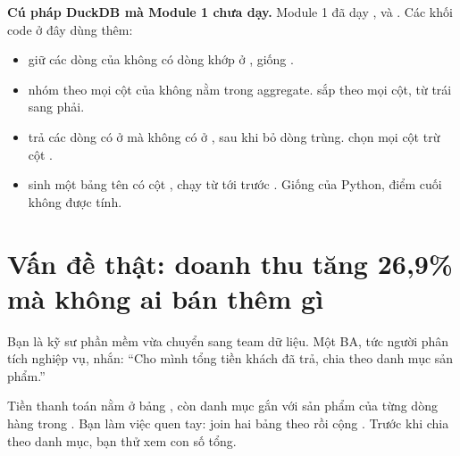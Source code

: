 \begin{ghichu}
\textbf{Cú pháp DuckDB mà Module 1 chưa dạy.} Module 1 đã dạy ,  và . Các khối code ở đây dùng thêm:
\begin{itemize}
  \item {} giữ các dòng của  không có dòng khớp ở , giống .
  \item {} nhóm theo mọi cột của  không nằm trong aggregate.  sắp theo mọi cột, từ trái sang phải.
  \item {} trả các dòng có ở  mà không có ở , sau khi bỏ dòng trùng.  chọn mọi cột trừ cột .
  \item {} sinh một bảng tên  có cột , chạy từ  tới trước . Giống  của Python, điểm cuối không được tính.
\end{itemize}
\end{ghichu}

\section{Vấn đề thật: doanh thu tăng 26,9\% mà không ai bán thêm gì}

Bạn là kỹ sư phần mềm vừa chuyển sang team dữ liệu. Một BA, tức người phân tích nghiệp vụ, nhắn: ``Cho mình tổng tiền khách đã trả, chia theo danh mục sản phẩm.''

Tiền thanh toán nằm ở bảng , còn danh mục gắn với sản phẩm của từng dòng hàng trong . Bạn làm việc quen tay: join hai bảng theo  rồi cộng . Trước khi chia theo danh mục, bạn thử xem con số tổng.

